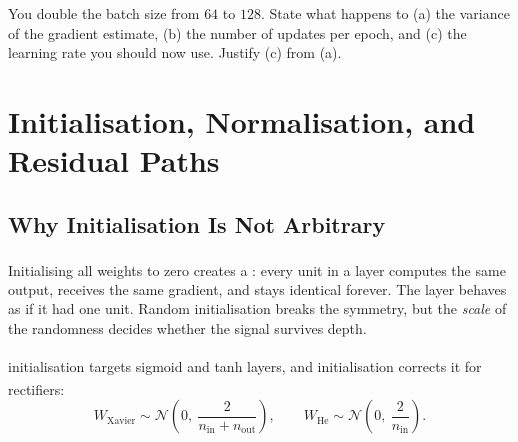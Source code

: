 \begin{checkpoint}
You double the batch size from $64$ to $128$. State what happens to (a) the
variance of the gradient estimate, (b) the number of updates per epoch, and
(c) the learning rate you should now use. Justify (c) from (a).
\end{checkpoint}

\section{Initialisation, Normalisation, and Residual Paths}
\label{sec:dl-init}

\subsection{Why Initialisation Is Not Arbitrary}

Initialising all weights to zero creates a \textsuperscript{\cite[][pp.~8--10]{robertsPrinciplesDeepLearning2022}}:
every unit in a layer computes the same output, receives the same gradient, and
stays identical forever. The layer behaves as if it had one unit. Random
initialisation breaks the symmetry, but the \emph{scale} of the randomness
decides whether the signal survives depth.

 initialisation targets sigmoid and tanh
layers\textsuperscript{\cite{glorotUnderstandingDifficultyTraining}}, and
 initialisation corrects it for
rectifiers\textsuperscript{\cite{heDelvingDeepRectifiers2015}}:
\begin{equation}
  W_{\text{Xavier}} \sim
  \mathcal{N}\!\left(0,\ \frac{2}{n_{\text{in}}+n_{\text{out}}}\right),
  \qquad
  W_{\text{He}} \sim
  \mathcal{N}\!\left(0,\ \frac{2}{n_{\text{in}}}\right).
  \label{eq:dl-init}
\end{equation}

